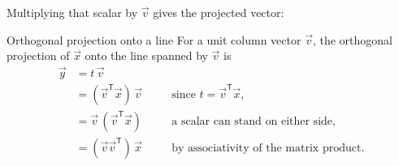 \documentclass[a4paper,12pt,oneside]{report}
\begin{document}
Multiplying that scalar by $\vec v$ gives the projected vector:
\begin{frameddefn}{Orthogonal projection onto a line}
\label{def:projection-line}
For a unit column vector $\vec v$, the orthogonal projection of
$\vec x$ onto the line spanned by $\vec v$ is
\[
\begin{aligned}
  \vec y&=t\,\vec v\\
        &=(\vec v^{\mathsf T}\vec x)\,\vec v
          &&\quad\text{since } t=\vec v^{\mathsf T}\vec x,\\
        &=\vec v\,(\vec v^{\mathsf T}\vec x)
          &&\quad\text{a scalar can stand on either side},\\
        &=(\vec v\vec v^{\mathsf T})\,\vec x
          &&\quad\text{by associativity of the matrix product}.
\end{aligned}
\]
\begin{center}
\end{center}
\end{frameddefn}
\end{document}
